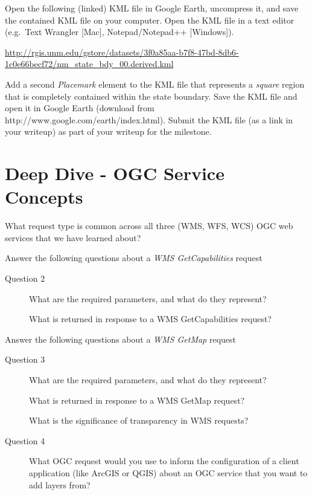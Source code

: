 \documentclass[]{book}
\providecommand{\tightlist}{%
  \setlength{\itemsep}{0pt}\setlength{\parskip}{0pt}}
\begin{document}
Open the following (linked) KML file in Google Earth, uncompress it, and
save the contained KML file on your computer. Open the KML file in a
text editor (e.g.~Text Wrangler {[}Mac{]}, Notepad/Notepad++
{[}Windows{]}).

\url{http://rgis.unm.edu/gstore/datasets/3f0a85aa-b7f8-47bd-8db6-1c0e66becf72/nm_state_bdy_00.derived.kml}

\begin{description}
\tightlist
\item[Question 7]
Add a second \emph{Placemark} element to the KML file that represents a
\emph{square} region that is completely contained within the state
boundary. Save the KML file and open it in Google Earth (download from
http://www.google.com/earth/index.html). Submit the KML file (as a link
in your writeup) as part of your writeup for the milestone.
\end{description}

\section{Deep Dive - OGC Service Concepts}\label{week06-deepDive}

\begin{description}
\tightlist
\item[Question 1]
What request type is common across all three (WMS, WFS, WCS) OGC web
services that we have learned about?
\end{description}

Answer the following questions about a \emph{WMS GetCapabilities}
request

\begin{description}
\item[Question 2]
What are the required parameters, and what do they represent?

What is returned in response to a WMS GetCapabilities request?
\end{description}

Answer the following questions about a \emph{WMS GetMap} request

\begin{description}
\item[Question 3]
What are the required parameters, and what do they represent?

What is returned in response to a WMS GetMap request?

What is the significance of transparency in WMS requests?
\item[Question 4]
What OGC request would you use to inform the configuration of a client
application (like ArcGIS or QGIS) about an OGC service that you want to
add layers from?
\end{description}
\end{document}
